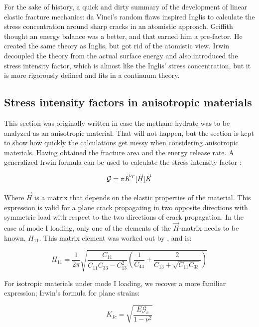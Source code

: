 For the sake of history, a quick and dirty summary of the development of linear elastic fracture mechanics: da Vinci's random flaws inspired Inglis to calculate the stress concentration around sharp cracks in an atomistic approach. Griffith thought an energy balance was a better, and that earned him a pre-factor. He created the same theory as Inglis, but got rid of the atomistic view. Irwin decoupled the theory from the actual surface energy and also introduced the stress intensity factor, which is almost like the Inglis' stress concentration, but it is more rigorously defined and fits in a continuum theory.

\subsection{Stress intensity factors in anisotropic materials}
This section was originally written in case the methane hydrate was to be analyzed as an anisotropic material. That will not happen, but the section is kept to show how quickly the calculations get messy when considering anisotropic materials. Having obtained the fracture area and the energy release rate. A generalized Irwin formula can be used to calculate the stress intensity factor \cite{Laubie2014}:

\begin{equation}
	\mathbf{\mathcal{G}} = \pi \vec{K}^T [\vec{H}] \vec{K} 
\end{equation}


Where $\vec{H}$ is a matrix that depends on the elastic properties of the material. This expression is valid for a plane crack propagating in two opposite directions with symmetric load with respect to the two directions of crack propagation. In the case of mode I loading, only one of the elements of the $\vec{H}$-matrix needs to be known, $H_{11}$. This matrix element was worked out by \citet{Laubie2014}, and is:

\begin{equation}
	H_{11} = \frac{1}{2\pi} \sqrt{\frac{C_{11}}{C_{11}C_{33}-C^2_{13}}\left( \frac{1}{C_{44}} + \frac{2}{C_{13} + \sqrt{C_{11} C_{33}}}\right)}
\end{equation}

For isotropic materials under mode I loading, we recover a more familiar expression; Irwin's formula for plane strains:

\begin{equation}
	K_{Ic} = \sqrt{\frac{E\mathcal{G}_{c}}{1-\nu^2}}
	\label{eq:energy_release_to_stress_intensity_isotropic}
\end{equation}



